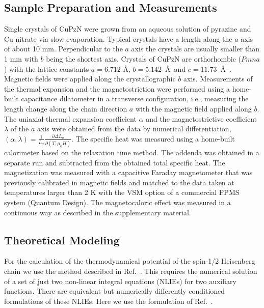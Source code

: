\documentclass[12pt]{article}
\begin{document}
\subsection*{Sample Preparation and Measurements}
Single crystals  of CuPzN were grown from an aqueous solution of pyrazine and Cu nitrate via slow evaporation. Typical crystals have a length along the $a$ axis of about 10 mm. Perpendicular to the $a$ axis the crystals are usually smaller than 1 mm with $b$ being the shortest axis. Crystals of CuPzN are orthorhombic ($Pmna$) with the lattice constants $a=6.712$ \AA, $b=5.142$~\AA\ and $c=11.73$~\AA\ \cite{Santoro1970}. Magnetic fields were applied along the crystallographic $b$ axis. Measurements of the thermal expansion and the magnetostriction were performed using a home-built capacitance dilatometer in a transverse configuration, i.e., measuring the length change along the chain direction $a$ with the magnetic field applied along $b$. The uniaxial thermal expansion coefficient $\alpha$ and the magnetostrictive coefficient $\lambda$ of the $a$ axis were obtained from the data by numerical differentiation, $(\alpha,\lambda)=\frac{1}{L_a} \frac{\partial\Delta L_a}{\partial (T,\mu_0 H)}$. The specific heat was measured using a home-built calorimeter based on the relaxation time method. The addenda was obtained in a separate run and subtracted from the obtained total specific heat. The magnetization was measured with a capacitive Faraday magnetometer that was previously calibrated in magnetic fields and matched to the data taken at temperatures larger than 2 K with the VSM option of a commercial PPMS system (Quantum Design). The magnetocaloric effect was measured in a continuous way as described in the supplementary material.

\subsection*{Theoretical Modeling}
For the calculation of the thermodynamical potential of the spin-1/2 Heisenberg chain we use the method described in Ref.~\cite{Klumper1998}. This requires the numerical solution of a set of just two non-linear integral equations (NLIEs) for two auxiliary functions. There are equivalent but numerically differently conditioned formulations of these NLIEs. Here we use the formulation of Ref.~\cite{Kundu2003}.
\end{document}
